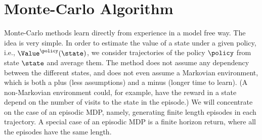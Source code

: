 







\section{Monte-Carlo Algorithm}
\label{sec:MC}

Monte-Carlo methods learn directly from experience in a model free
way. The idea is very simple. In order to estimate the value of a
state under a given policy, i.e., $\Value^\policy(\state)$, we
consider trajectories of the policy $\policy$ from state $\state$
and average them. The method does not assume any dependency between
the different states, and does not even assume a Markovian
environment, which is both a plus (less assumptions) and a minus
(longer time to learn). (A non-Markovian environment could, for
example, have the reward in a state depend on the number of visits
to the state in the episode.) We will concentrate on the case of an
episodic MDP, namely, generating finite length episodes in each
trajectory. A special case of an episodic MDP is a finite horizon
return, where all the episodes have the same length.

